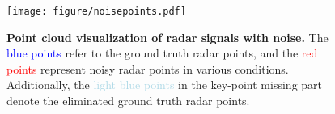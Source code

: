 \begin{figure}
    \centering
    \texttt{[image: figure/noisepoints.pdf]}
    \caption{\textbf{Point cloud visualization of radar signals with noise.} The \textcolor{blue}{blue points} refer to the ground truth radar points, and the \textcolor{red}{red points} represent noisy radar points in various conditions. Additionally, the \textcolor{lightblue}{light blue points} in the key-point missing part denote the eliminated ground truth radar points.
}
\label{noisypoint}
\end{figure}